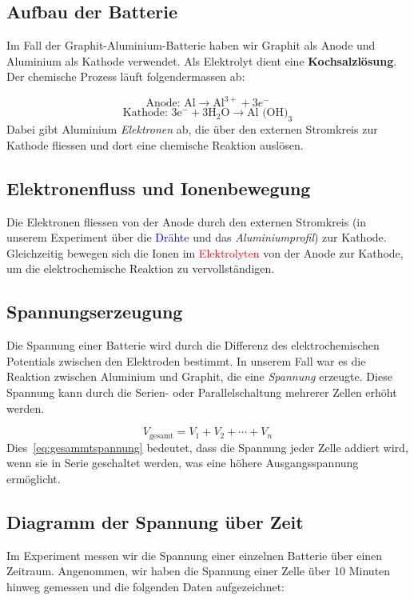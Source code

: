 \documentclass[ngerman, a4paper,12pt]{article}
\begin{document}
\subsection{Aufbau der Batterie}
Im Fall der Graphit-Aluminium-Batterie haben wir Graphit als Anode und Aluminium als Kathode verwendet. Als Elektrolyt dient eine \textbf{Kochsalzlösung}. Der chemische Prozess läuft folgendermassen ab:

\[
\text{Anode: } \text{Al} \rightarrow \text{Al}^{3+} + 3e^-
\]
\[
\text{Kathode: } 3\text{e}^- + 3\text{H}_2\text{O} \rightarrow \text{Al (OH)}_3
\]
Dabei gibt Aluminium \textit{Elektronen} ab, die über den externen Stromkreis zur Kathode fliessen und dort eine chemische Reaktion auslösen.\cite{author1}

\subsection{Elektronenfluss und Ionenbewegung}
Die Elektronen fliessen von der Anode durch den externen Stromkreis (in unserem Experiment über die \textcolor{blue}{Drähte} und das \textit{Aluminiumprofil}) zur Kathode. Gleichzeitig bewegen sich die Ionen im \textcolor{red}{Elektrolyten} von der Anode zur Kathode, um die elektrochemische Reaktion zu vervollständigen.

\subsection{Spannungserzeugung}
Die Spannung einer Batterie wird durch die Differenz des elektrochemischen Potentials zwischen den Elektroden bestimmt.\cite{author3} In unserem Fall war es die Reaktion zwischen Aluminium und Graphit, die eine \textit{Spannung} erzeugte. Diese Spannung kann durch die Serien- oder Parallelschaltung mehrerer Zellen erhöht werden.

\begin{equation}
    V_{\text{gesamt}} = V_1 + V_2 + \cdots + V_n
    \label{eq:gesammtspannung}
\end{equation}
\noindent Dies~\eqref{eq:gesammtspannung} bedeutet, dass die Spannung jeder Zelle addiert wird, wenn sie in Serie geschaltet werden, was eine höhere Ausgangsspannung ermöglicht.

\subsection{Diagramm der Spannung über Zeit}\label{sec:tabelle}
Im Experiment messen wir die Spannung einer einzelnen Batterie über einen Zeitraum. Angenommen, wir haben die Spannung einer Zelle über 10 Minuten hinweg gemessen und die folgenden Daten aufgezeichnet:
\end{document}
